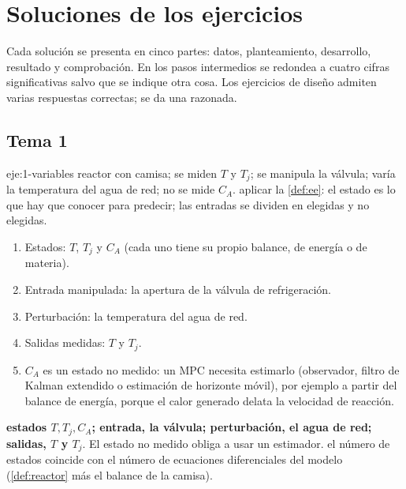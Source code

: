 \chapter{Soluciones de los ejercicios}
\label{ap:soluciones}

Cada solución se presenta en cinco partes: datos, planteamiento, desarrollo, resultado y comprobación. En los pasos intermedios se redondea a cuatro cifras significativas salvo que se indique otra cosa. Los ejercicios de diseño admiten varias respuestas correctas; se da una razonada.

\section{Tema 1}

\begin{solucion}{eje:1-variables}
\datos reactor con camisa; se miden $T$ y $T_j$; se manipula la válvula; varía la temperatura del agua de red; no se mide $C_A$.
\planteamiento aplicar la \cref{def:ee}: el estado es lo que hay que conocer para predecir; las entradas se dividen en elegidas y no elegidas.
\pasos
\begin{enumerate}[label=\arabic*.]
  \item Estados: $T$, $T_j$ y $C_A$ (cada uno tiene su propio balance, de energía o de materia).
  \item Entrada manipulada: la apertura de la válvula de refrigeración.
  \item Perturbación: la temperatura del agua de red.
  \item Salidas medidas: $T$ y $T_j$.
  \item $C_A$ es un estado no medido: un MPC necesita estimarlo (observador, filtro de Kalman extendido o estimación de horizonte móvil), por ejemplo a partir del balance de energía, porque el calor generado delata la velocidad de reacción.
\end{enumerate}
\resultado \textbf{estados $T,T_j,C_A$; entrada, la válvula; perturbación, el agua de red; salidas, $T$ y $T_j$}. El estado no medido obliga a usar un estimador.
\comprobacion el número de estados coincide con el número de ecuaciones diferenciales del modelo (\cref{def:reactor} más el balance de la camisa).
\end{solucion}

